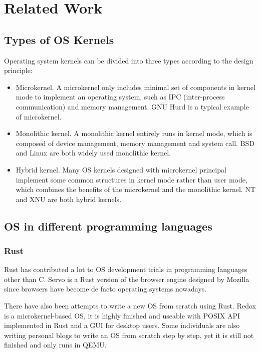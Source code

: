 \section{Related Work}

\subsection{Types of OS Kernels}

Operating system kernels can be divided into three types according to the design principle:

    \begin{itemize}
        \item Microkernel. A microkernel only includes minimal set of components in kernel mode to implement an operating system, such as IPC (inter-process communication) and memory management. GNU Hurd\cite{stallman1998gnu} is a typical example of microkernel.
        \item Monolithic kernel. A monolithic kernel entirely runs in kernel mode, which is composed of device management, memory management and system call. BSD\cite{mckusick1996design} and Linux\cite{stallman1997linux} are both widely used monolithic kernel.
        \item Hybrid kernel. Many OS kernels designed with microkernel principal implement some common structures in kernel mode rather than user mode, which combines the benefits of the microkernel and the monolithic kernel. NT\cite{solomon1998inside} and XNU\cite{singh2006mac} are both hybrid kernels.
    \end{itemize}

\subsection{OS in different programming languages}

\subsubsection{Rust}
Rust has contributed a lot to OS development trials in programming languages other than C.
Servo\cite{Servo} is a Rust version of the browser engine designed by Mozilla since browsers have become de facto operating systems nowadays.

There have also been attempts to write a new OS from scratch using Rust.
Redox\cite{Redox} is a microkernel-based OS, it is highly finished and useable with POSIX API implemented in Rust and a GUI for desktop users.
Some individuals are also writing personal blogs\cite{OsPhil} to write an OS from scratch step by step, yet it is still not finished and only runs in QEMU. 

